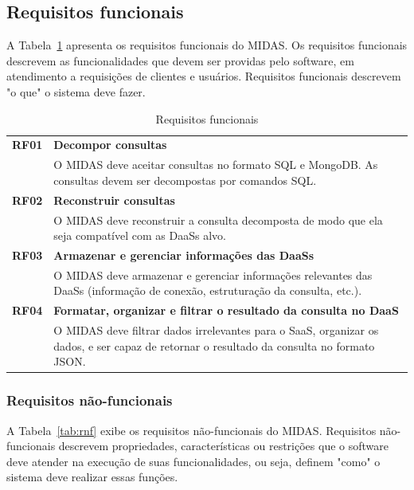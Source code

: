 \documentclass[11pt,a4paper]{article}
\begin{document}
\subsection*{Requisitos funcionais}

A Tabela~\ref{tab:rf} apresenta os requisitos funcionais do MIDAS. Os requisitos funcionais descrevem as funcionalidades que devem ser providas pelo software, em atendimento a requisições de  clientes e usuários. Requisitos funcionais descrevem "o que" o sistema deve fazer. 

\begin{table}[htb]
\centering
\caption{Requisitos funcionais} \label{tab:rf}
\begin{tabular*}{\linewidth}{@{\extracolsep{\fill}}|r p{13cm}|}    \hline
\textbf{RF01} 	& \textbf{Decompor consultas}\\ \cline{2-2}
 				& O MIDAS deve aceitar consultas no formato SQL e MongoDB. As consultas devem ser decompostas por comandos SQL.  \\\hline
\textbf{RF02} 	& \textbf{Reconstruir consultas}\\ \cline{2-2}
 				& O MIDAS deve reconstruir a consulta decomposta de modo que ela seja compatível com as DaaSs alvo.   \\ \hline
\textbf{RF03} 	& \textbf{Armazenar e gerenciar informações das DaaSs}\\ \cline{2-2}
 				& O MIDAS deve armazenar e gerenciar informações relevantes das DaaSs (informação de conexão, estruturação da consulta, etc.).  \\ \hline
 \textbf{RF04} 	& \textbf{Formatar, organizar e filtrar o resultado da consulta no DaaS}\\ \cline{2-2}
 				& O MIDAS deve filtrar dados irrelevantes para o SaaS, organizar os dados,  e ser capaz de retornar o resultado da consulta no formato JSON.  \\ \hline
\end{tabular*}
\end{table}

\subsubsection*{Requisitos não-funcionais}
A Tabela~\ref{tab:rnf} exibe os requisitos não-funcionais do MIDAS. Requisitos não-funcionais descrevem propriedades, características ou restrições que o software deve atender na execução de suas funcionalidades, ou seja, definem "como" o sistema deve realizar essas funções.
\end{document}
